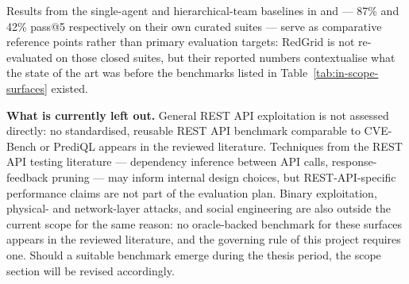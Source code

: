Results from the single-agent and hierarchical-team baselines in \citet{fang2024oneday} and \citet{zhu2024hptsa} --- 87\% and 42\% pass@5 respectively on their own curated suites --- serve as comparative reference points rather than primary evaluation targets: RedGrid is not re-evaluated on those closed suites, but their reported numbers contextualise what the state of the art was before the benchmarks listed in Table~\ref{tab:in-scope-surfaces} existed.

\textbf{What is currently left out.} General REST API exploitation is not assessed directly: no standardised, reusable REST API benchmark comparable to CVE-Bench or PrediQL appears in the reviewed literature. Techniques from the REST API testing literature --- dependency inference between API calls, response-feedback pruning --- may inform internal design choices, but REST-API-specific performance claims are not part of the evaluation plan. Binary exploitation, physical- and network-layer attacks, and social engineering are also outside the current scope for the same reason: no oracle-backed benchmark for these surfaces appears in the reviewed literature, and the governing rule of this project requires one. Should a suitable benchmark emerge during the thesis period, the scope section will be revised accordingly.
